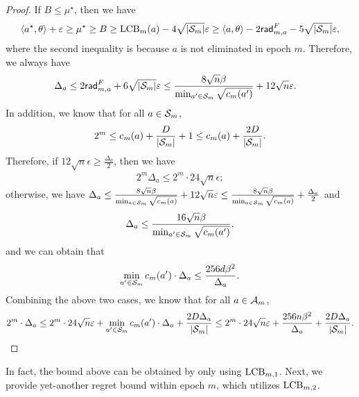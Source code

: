 \begin{proof}
    If $B\leq \mu^\star$, then we have
    \begin{align*}
        \left\langle {a^\star,\theta} \right\rangle+\varepsilon\geq \mu^\star\geq B \geq {\operatorname{LCB}}_{m}(a) - 4\sqrt{|{\mathcal{S}}_m|}\varepsilon \geq \left\langle {a,\theta} \right\rangle - 2\mathsf{rad}_{m,a}^{F} - 5\sqrt{|{\mathcal{S}}_m|}\varepsilon,
    \end{align*}
    where the second inequality is because $a$ is not eliminated in epoch $m$. Therefore, we always have
    \begin{align*}
        \Delta_a &\leq 2\mathsf{rad}_{m,a}^{F} + 6\sqrt{|{\mathcal{S}}_m|}\varepsilon \leq \frac{8\sqrt{n}\beta}{\min_{a'\in {\mathcal{S}}_m}\sqrt{c_m(a')}} + 12\sqrt{n}\varepsilon.
    \end{align*}
    In addition, we know that for all $a\in {\mathcal{S}}_m$,
    \begin{align*}
        2^m \leq c_m(a) + \frac{D}{|{\mathcal{S}}_m|} + 1 \leq c_m(a) + \frac{2D}{|{\mathcal{S}}_m|}.
    \end{align*}
    Therefore, if $12\sqrt{n}\epsilon\geq \frac{\Delta_a}{2}$, then we have
    \begin{align*}
        2^m\Delta_a\leq 2^m\cdot 24\sqrt{n}\epsilon;
    \end{align*}
    otherwise, we have $\Delta_a \leq \frac{8\sqrt{n}\beta}{\min_{a\in {\mathcal{S}}_m}\sqrt{c_m(a)}} + 12\sqrt{n}\varepsilon \leq \frac{8\sqrt{n}\beta}{\min_{a\in {\mathcal{S}}_m}\sqrt{c_m(a)}}  + \frac{\Delta_a}{2}$ and
    \begin{align*}
        \Delta_a \leq \frac{16\sqrt{n}\beta}{\min_{a'\in {\mathcal{S}}_m}\sqrt{c_m(a')}},
    \end{align*}
    and we can obtain that
    \begin{align*}
        \min_{a'\in {\mathcal{S}}_m}{c_m(a')}\cdot \Delta_a\leq \frac{256d\beta^2}{\Delta_a}.
    \end{align*}
    Combining the above two cases, we know that for all $a\in{\mathcal{A}}_m$, $$2^m\cdot \Delta_a\leq 2^m\cdot 24\sqrt{n}\varepsilon+ \min_{a'\in {\mathcal{S}}_m}c_m(a')\cdot \Delta_a + \frac{2D\Delta_a}{|{\mathcal{S}}_m|} \leq  2^m\cdot 24\sqrt{n}\varepsilon+\frac{256n\beta^2}{\Delta_a} + \frac{2D\Delta_a}{|{\mathcal{S}}_m|}.$$
\end{proof}

In fact, the bound above can be obtained by only using ${\operatorname{LCB}}_{m,1}$. Next, we provide yet-another regret bound within epoch $m$, which utilizes ${\operatorname{LCB}}_{m,2}$.

